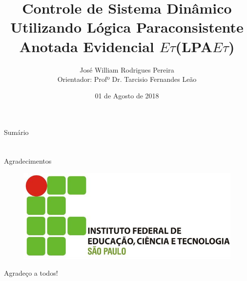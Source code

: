 \documentclass[handout,t]{beamer}
\title[]{
Controle de Sistema Dinâmico Utilizando Lógica Paraconsistente Anotada Evidencial $E\tau$(LPA$E\tau$)}
\date{01 de Agosto de 2018}
\author[José W. R. Pereira]
{
	José William Rodrigues Pereira\inst{1}\\
	\vspace{0.25cm}
	Orientador: Profº Dr. Tarcisio Fernandes Leão\inst{2}
}
\institute[INSTITUTO]
{
	\inst{1}%
	\url{josewrpereira@gmail.com}\\
	\vspace{0.25cm}
	\inst{2}%
	\url{leao@ifsp.edu.br}
\
}
\begin{document}
\frame{\titlepage}
\section[]{}
\begin{frame}{Sumário}
	\tableofcontents
\end{frame}













\section{}
  \begin{frame}{Agradecimentos}
    \begin{figure}[!htb]
      \center\includegraphics[scale=0.6]{./imagens/logo_IFSP.jpg}
    \end{figure}

    \centering

    \vspace{1cm}
    Agradeço a todos!
	
  \end{frame}
\end{document}
